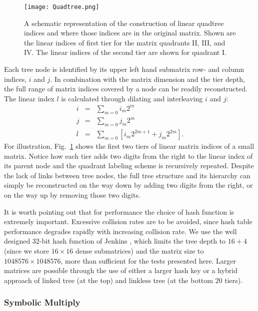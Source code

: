 \begin{figure}
\texttt{[image: Quadtree.png]}
\caption{\label{fig:linear_quadtree} A schematic representation of the
construction of linear quadtree indices and where those indices are in the
original matrix. Shown are the linear indices of first tier for the matrix
quadrants II, III, and IV. The linear indices of the second tier are shown for
quadrant I.}
\end{figure}

Each tree node is identified by its upper left hand submatrix row- and column
indices, $i$ and $j$. In combination with the matrix dimension and the tier
depth, the full range of matrix indices covered by a node can be readily
reconstructed.  The linear index $l$ is calculated through dilating and
interleaving $i$ and $j$:
\begin{eqnarray}
i     & = & \sum_{m = 0} i_{m} 2^{m} \\
j     & = & \sum_{m = 0} j_{m} 2^{m} \\
\label{eq:linear_index}
l     & = & \sum_{m = 0} \left[ i_{m} 2^{2m+1} + j_{m} 2^{2m} \right].
\end{eqnarray}
For illustration, Fig.~\ref{fig:linear_quadtree} shows the first two tiers of
linear matrix indices of a small matrix. Notice how each tier adds two digits
from the right to the linear index of its parent node and the quadrant labeling
scheme is recursively repeated. Despite the lack of links between tree nodes,
the full tree structure and its hierarchy can simply be reconstructed on the
way down by adding two digits from the right, or on the way up by removing
those two digits.

It is worth pointing out that for performance the choice of hash function is
extremely important. Excessive collision rates are to be avoided, since hash
table performance degrades rapidly with increasing collision rate. We use the
well designed 32-bit hash function of Jenkins \cite{Jenkins2006}, which limits
the tree depth to $16+4$ (since we store $16 \times 16$ dense submatrices) and
the matrix size to $1048576 \times 1048576$, more than sufficient for the tests
presented here. Larger matrices are possible through the use of either a larger
hash key or a hybrid approach of linked tree (at the top) and linkless tree (at
the bottom 20 tiers).

\subsubsection{Symbolic Multiply}
\label{sec:symbolic_multiply}

